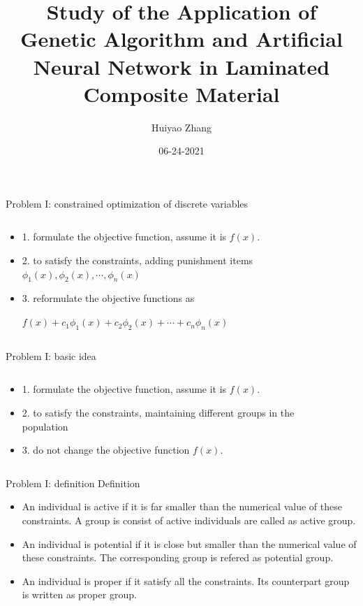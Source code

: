 \documentclass{beamer}
\title{Study of the Application of Genetic
Algorithm and Artificial Neural Network
in Laminated Composite Material}
\author{Huiyao Zhang}
\institute{Kyoto Institue of Technology}
\date{06-24-2021}
\begin{document}
\begin{frame}
    \titlepage
\end{frame}


\begin{frame}{Problem I: constrained optimization of discrete variables}
	\begin{columns}
		\begin{column}{0.65\textwidth}
			\begin{itemize}
				\item  1. formulate the objective function, assume it is $f(x)$.
				\item  2. to satisfy the constraints, adding punishment items
					$\phi_1(x),\phi_2(x),\cdots, \phi_n(x)$ 
				\item  3. reformulate the objective functions as

					$f(x)+c_1\phi_1(x)+c_2\phi_2(x)+ \cdots + c_n\phi_n(x)$
			\end{itemize}
		\end{column}
		\begin{column}{0.35\textwidth}
			
		\end{column}
	\end{columns}
\end{frame}


\begin{frame}{Problem I: basic idea}
	\begin{columns}
		\begin{column}{0.6\textwidth}
			\begin{itemize}
				\item  1. formulate the objective function, assume it is $f(x)$.
				\item  2. to satisfy the constraints, maintaining different groups in the population 
				\item  3. do not change the objective function $f(x)$.
			\end{itemize}
		\end{column}
		\begin{column}{0.4\textwidth}
			
		\end{column}
	\end{columns}
\end{frame}

\begin{frame}{Problem I: definition}
	Definition
		\begin{itemize}
			\item An individual is active if it is far smaller than the
				numerical value of these constraints. A group is consist of
				active individuals are called as active group.
			\item An individual is potential if it is close but smaller than the
				numerical value of these constraints. The corresponding group is
				refered as potential group.
			\item An individual is proper if it satisfy all the constraints. Its
				counterpart group is written as proper group.
		\end{itemize}
\end{frame}
\end{document}
